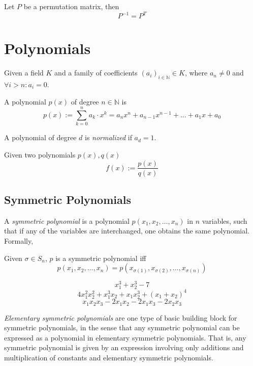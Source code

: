 \begin{proposition}
   Let \(P\) be a permutation matrix, then
   \[P^{-1} = P^T\]
\end{proposition}

\newpage

\section{Polynomials}
\begin{definition}[Polynomial]
   Given a field \(K\) and a family of coefficients \((a_i)_{i \in \mathbb{N}} \in K\), where \(a_n \neq 0\) and \(\forall i > n: a_i = 0\).

   A polynomial \(p(x)\) of degree \(n \in \mathbb{N}\) is
   \[p(x) := \sum_{k=0}^n a_k \cdot x^k = a_nx^n + a_{n-1}x^{n-1} + \ldots + a_1x + a_0\]
\end{definition}
\begin{remark}
   A polynomial of degree \(d\) is \textit{normalized} if \(a_d = 1\).
\end{remark}

\begin{definition}
   Given two polynomials \(p(x), q(x)\)
   \[f(x) := \frac{p(x)}{q(x)}\]
\end{definition}

\subsection{Symmetric Polynomials}
A \emph{symmetric polynomial} is a polynomial \(p(x_1, x_2, \ldots, x_n)\) in \(n\) variables, such that if any of the variables are interchanged, one obtains the same polynomial.
Formally,
\begin{definition}
   Given \(\sigma \in S_n\), \(p\) is a symmetric polynomial iff
   \[p(x_1, x_2, \ldots, x_n) = p(x_{\sigma(1)}, x_{\sigma(2)}, \ldots, x_{\sigma(n)})\]
\end{definition}
\begin{example}
   \[x_1^3 + x_2^3-7\]
   \[4x_1^2x_2^2 + x_1^3x_2 + x_1x_2^3 + (x_1 + x_2)^4\]
   \[x_1x_2x_3 - 2x_1x_2 - 2x_1x_3 - 2x_2x_3\]
\end{example}
\emph{Elementary symmetric polynomials} are one type of basic building block for symmetric polynomials, in the sense that any symmetric polynomial can be expressed as a polynomial in elementary symmetric polynomials.
That is, any symmetric polynomial is given by an expression involving only additions and multiplication of constants and elementary symmetric polynomials.


